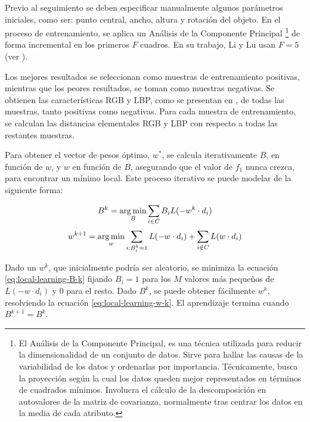 Previo al seguimiento se deben especificar manualmente algunos parámetros iniciales,
como ser: punto central, ancho, altura y rotación del objeto. En el proceso de
entrenamiento, se aplica un Análisis de la Componente Principal
\footnote{El Análisis de la Componente Principal, es una técnica utilizada para reducir la dimensionalidad de un conjunto de datos.
Sirve para hallar las causas de la variabilidad de los datos y ordenarlas por importancia.
Técnicamente, busca la proyección según la cual los datos queden mejor representados en términos de cuadrados mínimos. Involucra el cálculo de la descomposición en
autovalores de la matriz de covarianza, normalmente tras centrar los datos en la media de cada atributo.}
de forma incremental en los primeros $F$ cuadros. En su trabajo, Li y Lu usan
$F = 5$ (ver \cite{local-learning}).

Los mejores resultados se seleccionan como muestras de entrenamiento positivas, mientras que
los peores resultados, se toman como muestras negativas. Se obtienen las características
RGB y LBP, como se presentan en \cite{tracking-bag-of-features}, de todas las muestras,
tanto positivas como negativas. Para cada muestra de entrenamiento, se calculan las
distancias elementales RGB y LBP con respecto a todas las restantes muestras.

Para obtener el vector de pesos óptimo, $w^{*}$, se calcula iterativamente $B$,
en función de $w$, y $w$ en función de $B$, asegurando que el valor de $f_{1}$ nunca
crezca, para encontrar un mínimo local. Este proceso iterativo se puede modelar de la
siguiente forma:

\begin{equation}
   \label{eq:local-learning-B-k}
   B^{k} = \operatorname*{arg\,min}_{B} \sum_{i \in C} B_{i}L(-w^{k} \cdot d_{i})
\end{equation}
\begin{equation}
    \label{eq:local-learning-w-k}
    w^{k+1} = \operatorname*{arg\,min}_{w} \sum_{i:B_{i}^{k}=1} L(-w \cdot d_{i}) + \sum_{i\notin C}L(w \cdot d_{i})
\end{equation}

Dado un $w^{k}$, que inicialmente podría ser aleatorio, se minimiza la ecuación
\ref{eq:local-learning-B-k} fijando $B_{i} = 1$ para los $M$ valores más
pequeños de $L(-w \cdot d_{i})$ y $0$ para el resto. Dado $B^{k}$, se puede
obtener fácilmente $w^{k}$, resolviendo la ecuación \ref{eq:local-learning-w-k}.
El aprendizaje termina cuando $B^{k+1}=B^{k}$.\\

